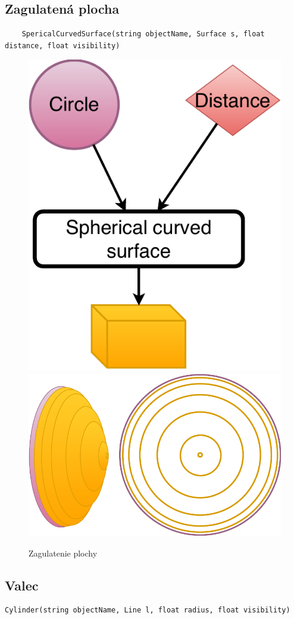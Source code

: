 \subsection{Zagulatená plocha}
\begin{lstlisting}
    SpericalCurvedSurface(string objectName, Surface s, float distance, float visibility)
\end{lstlisting}

\begin{figure}[H]
	\centering
	\includegraphics[height=0.3\textwidth]{obrazky-figures/Diagram/Volumetric/DP Navrh operacii-3D - ObjectsSpherical curved surface.pdf}
	\includegraphics[height=0.3\textwidth]{obrazky-figures/Diagram/Draw/4Object/DP Navrh operacii-3D - ObjectsSpherical curved surface.pdf}
	\caption{Zagulatenie plochy}
	\label{fig:ObjectsSpherical curved surface}
\end{figure}



\subsection{Valec}
\begin{lstlisting}
Cylinder(string objectName, Line l, float radius, float visibility)
\end{lstlisting}

